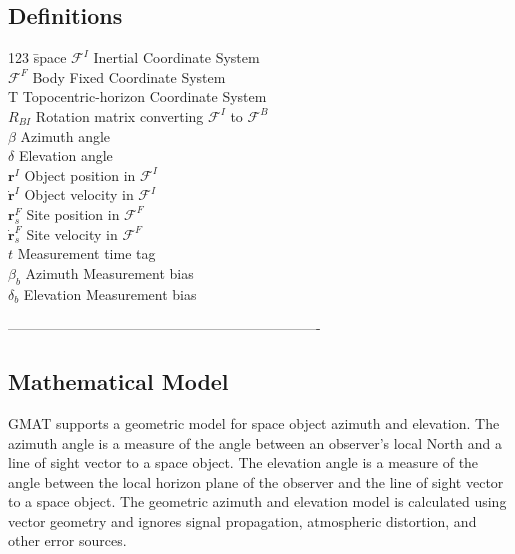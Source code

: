 \subsection*{Definitions}
\begin{tabbing}[htbp!]
123  \= space \kill
$\mathcal{F}^I$ \> Inertial Coordinate System\\
$\mathcal{F}^F$ \> Body Fixed Coordinate System\\
T \> Topocentric-horizon Coordinate System\\
$R_{BI}$ \> Rotation matrix converting $\mathcal{F}^I$ to $\mathcal{F}^B$ \\
$\beta$ \> Azimuth angle\\
$\delta$ \> Elevation angle\\
$\mathbf{r}^{I}$ \> Object position in $\mathcal{F}^I$\\
$\dot{\mathbf{r}}^{I}$ \> Object velocity in $\mathcal{F}^I$\\
$\mathbf{r}^{F}_s$ \> Site position in $\mathcal{F}^F$\\
$\dot{\mathbf{r}}^{F}_s$    \> Site velocity in $\mathcal{F}^F$\\
$t$    \> Measurement time tag\\
$\beta_b$    \> Azimuth Measurement bias\\
$\delta_b$    \> Elevation Measurement bias\\
\end{tabbing}
-------------------------------------------------------------------

\subsection*{Mathematical Model}

GMAT supports a geometric model for space object azimuth and
elevation. The azimuth angle is a measure of the angle between an
observer's local North and a line of sight vector to a space object.
The elevation angle is a measure of the angle between the local
horizon plane of the observer and the line of sight vector to a
space object. The geometric azimuth and elevation model is
calculated using vector geometry and ignores signal propagation,
atmospheric distortion, and other error sources.

